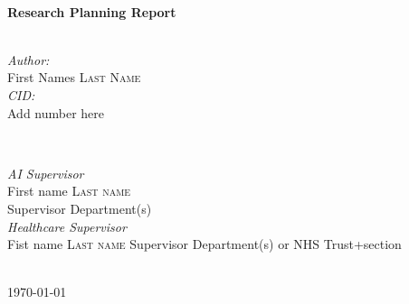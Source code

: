 \begin{titlepage}
\HRule \\[0.4cm]
{ \huge \bfseries Research Planning Report}\\[0.4cm] %
\HRule \\[1cm]
 

\begin{minipage}{0.4\textwidth}
\begin{flushleft} \large
\emph{Author:}\\
First Names \textsc{Last Name} \\ %
\emph{CID:}\\
Add number here
\end{flushleft}
\end{minipage}
~
\begin{minipage}{0.5\textwidth}
\begin{flushright} \large
\emph{AI Supervisor} \\
First name \textsc{Last name} \\%
Supervisor Department(s)\\
[0.5cm] \emph{Healthcare Supervisor} \\
Fist name \textsc{Last name} %
Supervisor Department(s)  or NHS Trust+section\\
\end{flushright}
\end{minipage}\\[1cm]


{\large \today}\\[0.5cm] %

\vfill %

\end{titlepage}

\renewcommand{\abstractname}{Summary}
\begin{abstract}
\emph{a 100 word summary of your phd project's motivation, goal and expected outcomes}
\end{abstract}

